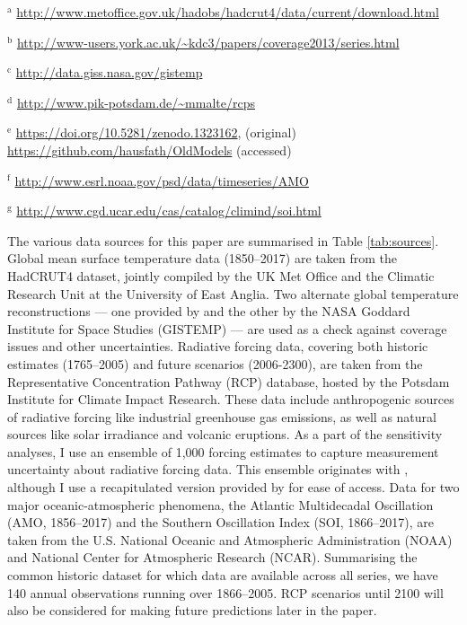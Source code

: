 \documentclass[smallextended]{svjour3}       %
\begin{document}
\begin{table}[t]
\begin{threeparttable}
\begin{tablenotes}
            \item $^\text{a}$ \url{http://www.metoffice.gov.uk/hadobs/hadcrut4/data/current/download.html}
            \item $^\text{b}$ \url{http://www-users.york.ac.uk/~kdc3/papers/coverage2013/series.html} 
            \item $^\text{c}$ \url{http://data.giss.nasa.gov/gistemp}
            \item $^\text{d}$ \url{http://www.pik-potsdam.de/~mmalte/rcps} 
            \item $^\text{e}$ \url{https://doi.org/10.5281/zenodo.1323162}, (original) \url{https://github.com/hausfath/OldModels} (accessed)
            \item $^\text{f}$ \url{http://www.esrl.noaa.gov/psd/data/timeseries/AMO}
                \item $^\text{g}$ \url{http://www.cgd.ucar.edu/cas/catalog/climind/soi.html}        
            \end{tablenotes}
    \end{threeparttable} 
\end{table}

The various data sources for this paper are summarised in Table
\ref{tab:sources}. Global mean surface temperature data (1850--2017) are
taken from the HadCRUT4 dataset, jointly compiled by the UK Met Office
and the Climatic Research Unit at the University of East Anglia. Two
alternate global temperature reconstructions --- one provided by
\cite{cowtan2014coverage} and the other by the NASA Goddard Institute
for Space Studies (GISTEMP) --- are used as a check against coverage
issues and other uncertainties. Radiative forcing data, covering both
historic estimates (1765--2005) and future scenarios (2006-2300), are
taken from the Representative Concentration Pathway (RCP) database,
hosted by the Potsdam Institute for Climate Impact Research. These data
include anthropogenic sources of radiative forcing like industrial
greenhouse gas emissions, as well as natural sources like solar
irradiance and volcanic eruptions. As a part of the sensitivity
analyses, I use an ensemble of 1,000 forcing estimates to capture
measurement uncertainty about radiative forcing data. This ensemble
originates with \cite{dessler2018ecs}, although I use a recapitulated
version provided by \cite{hausfather2020evaluating} for ease of access.
Data for two major oceanic-atmospheric phenomena, the Atlantic
Multidecadal Oscillation (AMO, 1856--2017) and the Southern Oscillation
Index (SOI, 1866--2017), are taken from the U.S. National Oceanic and
Atmospheric Administration (NOAA) and National Center for Atmospheric
Research (NCAR). Summarising the common historic dataset for which data
are available across all series, we have 140 annual observations running
over 1866--2005. RCP scenarios until 2100 will also be considered for
making future predictions later in the paper.
\end{document}
